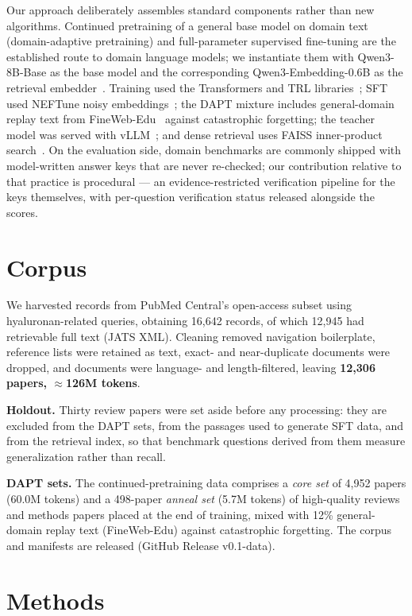 \documentclass[11pt]{article}
\begin{document}
Our approach deliberately assembles standard components rather than new
algorithms. Continued pretraining of a general base model on domain text
(domain-adaptive pretraining) and full-parameter supervised fine-tuning
are the established route to domain language models; we instantiate them
with Qwen3-8B-Base as the base model and the corresponding
Qwen3-Embedding-0.6B as the retrieval embedder~\cite{qwen3}. Training used
the Transformers and TRL libraries~\cite{transformers,trl}; SFT used
NEFTune noisy embeddings~\cite{neftune}; the DAPT mixture includes
general-domain replay text from FineWeb-Edu~\cite{fineweb} against
catastrophic forgetting; the teacher model was served with
vLLM~\cite{vllm}; and dense retrieval uses FAISS inner-product
search~\cite{faiss}. On the evaluation side, domain benchmarks are
commonly shipped with model-written answer keys that are never re-checked;
our contribution relative to that practice is procedural --- an
evidence-restricted verification pipeline for the keys themselves, with
per-question verification status released alongside the scores.

\section{Corpus}

We harvested records from PubMed Central's open-access subset using
hyaluronan-related queries, obtaining 16,642 records, of which 12,945 had
retrievable full text (JATS XML). Cleaning removed navigation boilerplate,
reference lists were retained as text, exact- and near-duplicate documents
were dropped, and documents were language- and length-filtered, leaving
\textbf{12,306 papers, $\approx$126M tokens}.

\textbf{Holdout.} Thirty review papers were set aside before any
processing: they are excluded from the DAPT sets, from the passages used to
generate SFT data, and from the retrieval index, so that benchmark
questions derived from them measure generalization rather than recall.

\textbf{DAPT sets.} The continued-pretraining data comprises a \emph{core
set} of 4,952 papers (60.0M tokens) and a 498-paper \emph{anneal set}
(5.7M tokens) of high-quality reviews and methods papers placed at the end
of training, mixed with 12\% general-domain replay text (FineWeb-Edu)
against catastrophic forgetting. The corpus and manifests are released
(GitHub Release v0.1-data).

\section{Methods}
\end{document}
